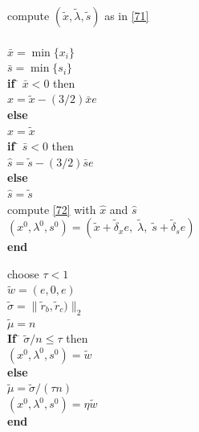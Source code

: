 \documentclass[a4paper,10 pt,titlepage,twoside]{book}
\theoremstyle{plain}
\theoremstyle{definition}
\theoremstyle{remark}
\begin{document}
\begin{figure}
	\centering
	\subfloat
	{\noindent\begin{boxedminipage}{1\linewidth}
			\begin{tabbing}
				compute $(\tilde{x},\tilde{\lambda},\tilde{s})$ as in \ref{71}\\
				\>\\
				$\bar{x} = \min\{x_{i}\}$\\
				$\bar{s} = \min\{s_{i}\}$\\
				\textbf{if} \= $\bar{x}<0$ then\\
				\> $\hat{x}= \tilde{x} -(3/2)\bar{x}e$\\
				\textbf{else} \=\\
				\> $\hat{x} = \tilde{x}$\\
				\textbf{if} \= $\bar{s}<0$ then\\
				\> $\hat{s}= \tilde{s} -(3/2)\bar{s}e$\\
				\textbf{else} \=\\
				\> $\hat{s} = \tilde{s}$\\
				compute \=\ref{72} with $\hat{x}$ and $\hat{s}$\\
				\>$(x^{0}, \lambda^{0}, s^{0}) = (\tilde{x}+\tilde{\delta}_{x} e,\;\tilde{\lambda},\;\tilde{s}+\tilde{\delta}_{s} e)$\\
				\textbf{end}
			\end{tabbing}
		\end{boxedminipage}
		} \quad
\subfloat
	{
	\begin{boxedminipage}{1\linewidth}
		\begin{tabbing}
			choose $\tau < 1$ \\
			$\tilde{w}=(e,0,e)$\\
			$\tilde{\sigma}= \lVert\tilde{r}_{b},\tilde{r}_{c})\rVert_{2}$\\
			$\tilde{\mu}= n$\\
			\textbf{If} \= $\tilde{\sigma}/n\leq \tau$ then\\
			\> $(x^{0}, \lambda^{0}, s^{0}) = \tilde{w}$\\
			\textbf{else}\>\\
			\> $\tilde{\mu}=\tilde{\sigma}/(\tau n)$ \\
			\> $(x^{0}, \lambda^{0}, s^{0}) = \eta \tilde{w}$\\
			\textbf{end}
		\end{tabbing}
	\end{boxedminipage}

} 
\end{figure}
\end{document}
